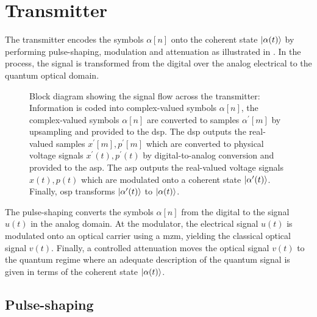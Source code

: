 \section{Transmitter}

The transmitter encodes the symbols $\alpha[n]$ onto the coherent state $\ket{\alpha(t)}$ by performing pulse-shaping, modulation and attenuation as illustrated in .
In the process, the signal is transformed from the digital over the analog electrical to the quantum optical domain.
\begin{figure}[htb]
	\centering
	
	\caption{Block diagram showing the signal flow across the transmitter: Information is coded into complex-valued symbols $\alpha[n]$, the complex-valued symbols $\alpha[n]$ are converted to samples $\alpha^\prime[m]$ by upsampling and provided to the \gls{dsp}. The \gls{dsp} outputs the real-valued samples $x^\prime[m],p^\prime[m]$ which are converted to physical voltage signals $x^\prime(t),p^\prime(t)$ by digital-to-analog conversion and provided to the \gls{asp}. The \gls{asp} outputs the real-valued voltage signals $x(t),p(t)$ which are modulated onto a coherent state $\ket{\alpha^\prime(t)}$. Finally, \gls{osp} transforms $\ket{\alpha^\prime(t)}$ to $\ket{\alpha(t)}$.}\label{fig:transmitter}
\end{figure}
The pulse-shaping converts the symbols $\alpha[n]$ from the digital to the signal $u(t)$ in the analog domain.
At the modulator, the electrical signal $u(t)$ is modulated onto an optical carrier using a \gls{mzm}, yielding the classical optical signal $v(t)$.
Finally, a controlled attenuation moves the optical signal $v(t)$ to the quantum regime where an adequate description of the quantum signal is given in terms of the coherent state $\ket{\alpha(t)}$.

\subsection{Pulse-shaping}


